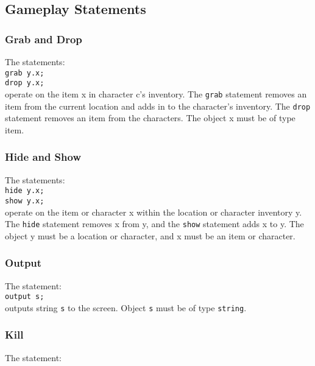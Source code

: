 \documentclass[12pt]{article}
\begin{document}
\subsection{Gameplay Statements}
\subsubsection{Grab and Drop}
The statements: \\

\texttt{grab y.x;} \\
\indent \texttt{drop y.x;} \\

\noindent operate on the item x in character c's inventory.  The \texttt{grab} statement removes an item from the current location and adds in to the character's inventory.  The \texttt{drop} statement removes an item from the characters.  The object x must be of type item.

\subsubsection{Hide and Show}
The statements:\\

\texttt{hide y.x;} \\
\indent \texttt{show y.x;} \\

\noindent operate on the item or character x within the location or character inventory y.  The \texttt{hide} statement removes x from y, and the \texttt{show} statement adds x to y.  The object y must be a location or character, and x must be an item or character.

\noindent

\subsubsection{Output}
The statement: \\

\texttt{output s;} \\

\noindent outputs string \texttt{s} to the screen.  Object \texttt{s} must be of type \texttt{string}.

\subsubsection{Kill}
The statement: \\
\end{document}
